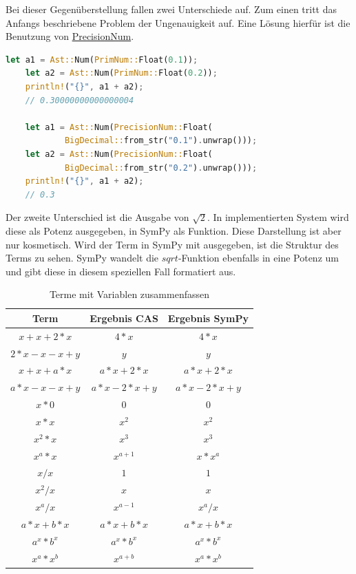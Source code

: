 \documentclass[11pt,a4paper, ngerman]{article}
\begin{document}
Bei dieser Gegenüberstellung fallen zwei Unterschiede auf. Zum einen tritt das Anfangs beschriebene Problem der Ungenauigkeit auf. Eine Lösung hierfür ist die Benutzung von \hyperref[sec:NumTypes]{PrecisionNum}.

\begin{lstlisting}[language=rust, caption={PrimNum vs. PrecisionNum}]
    let a1 = Ast::Num(PrimNum::Float(0.1));
    let a2 = Ast::Num(PrimNum::Float(0.2));
    println!("{}", a1 + a2);
    // 0.30000000000000004

    let a1 = Ast::Num(PrecisionNum::Float(
            BigDecimal::from_str("0.1").unwrap()));
    let a2 = Ast::Num(PrecisionNum::Float(
            BigDecimal::from_str("0.2").unwrap()));
    println!("{}", a1 + a2);
    // 0.3
\end{lstlisting}

Der zweite Unterschied ist die Ausgabe von $\sqrt{2}$. In implementierten System wird diese als Potenz ausgegeben, in SymPy als Funktion. Diese Darstellung ist aber nur kosmetisch. Wird der Term in SymPy mit  ausgegeben, ist die Struktur des Terms zu sehen. SymPy wandelt die $sqrt$-Funktion ebenfalls in eine Potenz um und gibt diese in diesem speziellen Fall formatiert aus.

\newpage

\begin{table}[ht!]
    \caption{Terme mit Variablen zusammenfassen}
    \centering
    \begin{tabular}{|c|c|c|}
        \hline
        \textbf{Term} & \textbf{Ergebnis CAS} & \textbf{Ergebnis SymPy} \\
        \hline
        $x+x+2*x$ & $4*x$ & $4*x$ \\
        \hline
        $2*x-x-x+y$ & $y$ & $y$ \\
        \hline
        $x+x+a*x$ & $a*x+2*x$ & $a*x + 2*x$ \\
        \hline
        $a*x-x-x+y$ & $a*x-2*x+y$ & $a*x - 2*x + y$ \\
        \hline
        $x*0$ & $0$ & $0$ \\
        \hline
        $x*x$ & $x^2$ & $x^2$ \\
        \hline
        $x^2*x$ & $x^3$ & $x^3$ \\
        \hline
        $x^a*x$ & $x^{a+1}$ & $x*x^a$ \\
        \hline
        $x/x$ & $1$ & $1$ \\
        \hline
        $x^2/x$ & $x$ & $x$ \\
        \hline
        $x^a/x$ & $x^{a-1}$ & $x^a/x$ \\
        \hline
        $a*x+b*x$ & $a*x+b*x$ & $a*x+b*x$ \\
        \hline
        $a^x*b^x$ & $a^x*b^x$ & $a^x*b^x$ \\
        \hline
        $x^a*x^b$ & $x^{a+b}$ & $x^a*x^b$ \\
        \hline
    \end{tabular}
\end{table}
\end{document}

